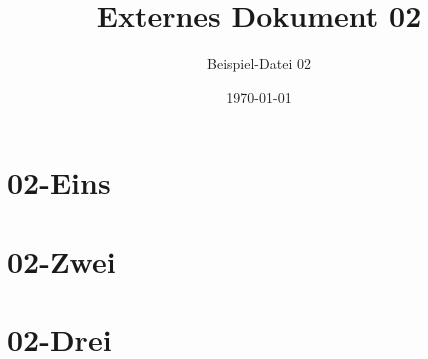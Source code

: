 \documentclass[12pt, headings=small]{scrreprt}
\title{Externes Dokument 02}
\subtitle{Beispiel-Datei 02}
\author{}
\date{\today}
\begin{document}
\maketitle
\tableofcontents
  \chapter{02-Eins}
		\label{cha:Eins}
		\blindtext[2]

		\blindtext[2]

	\chapter{02-Zwei}
		\label{cha:Zwei}
		\blindtext[2]
		
		\blindtext[2]
	\chapter{02-Drei}
		\label{cha:Drei}
		\blindtext[2]
		
		\blindtext[2]
\end{document}
